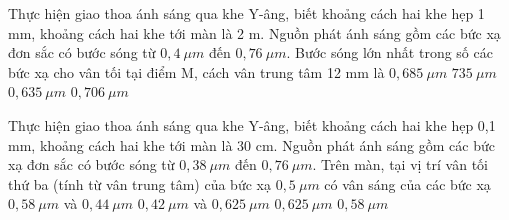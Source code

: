 \begin{ex}%
Thực hiện giao thoa ánh sáng qua khe Y-âng, biết khoảng cách hai khe hẹp 1 mm, khoảng cách hai
khe tới màn là 2 m. Nguồn phát ánh sáng gồm các bức xạ đơn sắc có bước sóng từ $0,4\ \mu m$ đến $0,76\ \mu m$. Bước sóng lớn nhất trong số các bức xạ cho vân tối tại điểm M,
cách vân trung tâm 12 mm là
\choice
{ $0,685\ \mu m $}
{ $735\ \mu m $}
{ $0,635\ \mu m $}
{\True $0,706\ \mu m $}
\end{ex} 
\begin{ex}%
Thực hiện giao thoa ánh sáng qua khe Y-âng, biết khoảng cách hai khe hẹp 0,1 mm, khoảng cách hai
khe tới màn là 30 cm. Nguồn phát ánh sáng gồm các bức xạ đơn sắc có bước sóng từ $0,38\ \mu m $ đến $0,76\ \mu m $. Trên màn, tại vị trí vân tối thứ ba (tính từ vân trung tâm) của bức xạ $0,5\ \mu m $ có vân sáng của các bức xạ
\choice
{ $0,58\ \mu m $ và $0,44\ \mu m $}
{\True $0,42\ \mu m $ và $0,625\ \mu m $}
{ $0,625\ \mu m $}
{ $0,58\ \mu m $}
\end{ex} 

